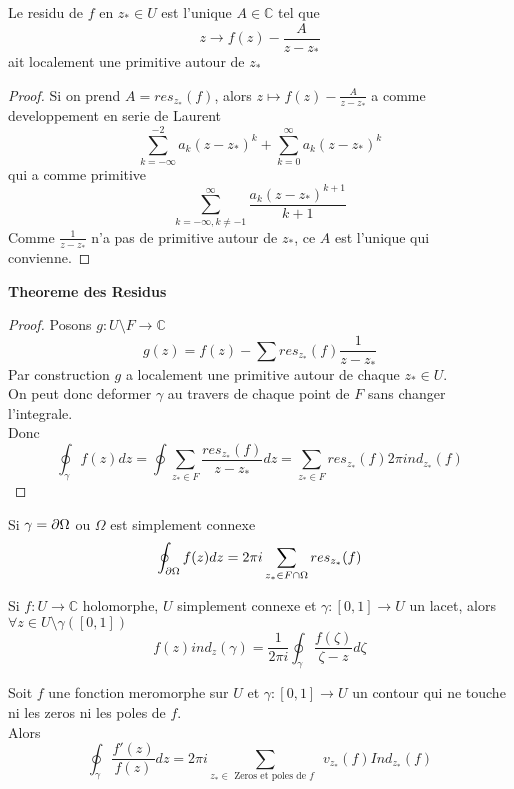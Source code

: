 \documentclass[../main.tex]{subfiles}
\begin{document}
\begin{lemma}
Le residu de $f$ en $z_*\in U$ est l'unique $A\in \mathbb{C}$ tel que
\[ 
	z\to f( z) - \frac{A}{z-z_*}
\]
ait localement une primitive autour de $z_*$ 
\end{lemma}
\begin{proof}
Si on prend $A= res_{z_*} ( f) $, alors $z\mapsto f( z) - \frac{A}{z-z_*}$ a comme developpement en serie de Laurent
\[ 
\sum_{k= - \infty }^{ -2} a_k ( z-z_*)^{k} + \sum_{k=0}^{ \infty }a_k ( z-z_*) ^{k}
\]
qui a comme primitive
\[ 
\sum_{k= - \infty , k\neq -1}^{ \infty } \frac{a_k ( z-z_*)^{k+1}}{k+1}
\]
Comme $\frac{1}{z-z_*}$ n'a pas de primitive autour de $z_*$, ce $A$ est l'unique qui convienne.

\end{proof}
\textbf{Theoreme des Residus}
\begin{proof}
Posons $g:U\setminus F\to \mathbb{C}$ 
\[ 
g( z) = f( z) - \sum res_{z_*} ( f) \frac{1}{z-z_*}
\]
Par construction $g$  a localement une primitive autour de chaque $z_*\in U$.\\
On peut donc deformer $\gamma$ au travers de chaque point de $F$ sans changer l'integrale.\\
Donc
\[ 
\oint_{\gamma} f( z) dz = \oint \sum_{z_*\in F} \frac{res_{z_*} ( f) }{z-z_*}dz = \sum_{z_*\in F}^{ }res_{z_*} ( f) 2\pi ind_{z_*} ( f)
\]

\end{proof}
\begin{crly}
Si $\gamma = \partial \Omega$ ou $\Omega$ est simplement connexe
\begin{align*}
\oint_{\partial\Omega} f( z) dz = 2\pi i \sum_{z_*\in F\cap \Omega} res_{z_*} ( f) 
\end{align*}

\end{crly}
\begin{crly}
Si $f:U\to \mathbb{C}$ holomorphe, $U$ simplement connexe et $\gamma: [ 0,1] \to U$ un lacet, alors $\forall z \in U\setminus \gamma( [ 0,1] ) $ 
\[ 
f( z) ind_z( \gamma)= \frac{ 1}{2\pi i}\oint_{\gamma}  \frac{f( \zeta) }{\zeta-z}d\zeta
\]

\end{crly}
\begin{crly}
	
Soit $f$ une fonction meromorphe sur $U$ et $\gamma: [ 0,1] \to U$ un contour qui ne touche ni les zeros ni les poles de $f$.\\
Alors
\[ 
	\oint_{\gamma} \frac{f'( z) }{f( z) }dz = 2\pi i\sum_{z_*\in \text{ Zeros et poles de $f$  } } v_{z_*} ( f) Ind_{z_*} (f) 
\]

\end{crly}
\end{document}
